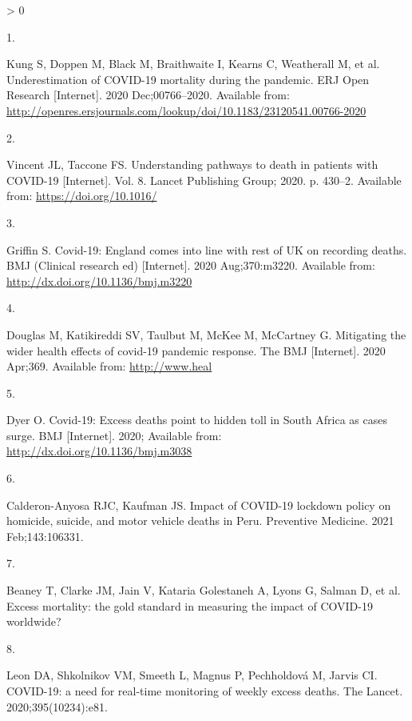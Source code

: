 \documentclass[
]{article}
\newlength{\cslhangindent}
\newlength{\csllabelwidth}
\newenvironment{CSLReferences}[2] %
 {%
  \setlength{\parindent}{0pt}
  \ifodd #1 \everypar{\setlength{\hangindent}{\cslhangindent}}\ignorespaces\fi
  \ifnum #2 > 0
  \setlength{\parskip}{#2\baselineskip}
  \fi
 }%
 {}
\newcommand{\CSLLeftMargin}[1]{\parbox[t]{\csllabelwidth}{#1}}
\newcommand{\CSLRightInline}[1]{\parbox[t]{\linewidth - \csllabelwidth}{#1}\break}
\begin{document}
\hypertarget{refs}{}
\begin{CSLReferences}{0}{0}
\leavevmode\hypertarget{ref-Kung2020}{}%
\CSLLeftMargin{1. }
\CSLRightInline{Kung S, Doppen M, Black M, Braithwaite I, Kearns C, Weatherall M, et al. {Underestimation of COVID-19 mortality during the pandemic}. ERJ Open Research {[}Internet{]}. 2020 Dec;00766--2020. Available from: \url{http://openres.ersjournals.com/lookup/doi/10.1183/23120541.00766-2020}}

\leavevmode\hypertarget{ref-Vincent2020}{}%
\CSLLeftMargin{2. }
\CSLRightInline{Vincent JL, Taccone FS. {Understanding pathways to death in patients with COVID-19} {[}Internet{]}. Vol. 8. Lancet Publishing Group; 2020. p. 430--2. Available from: \url{https://doi.org/10.1016/}}

\leavevmode\hypertarget{ref-Griffin2020}{}%
\CSLLeftMargin{3. }
\CSLRightInline{Griffin S. {Covid-19: England comes into line with rest of UK on recording deaths}. BMJ (Clinical research ed) {[}Internet{]}. 2020 Aug;370:m3220. Available from: \url{http://dx.doi.org/10.1136/bmj.m3220}}

\leavevmode\hypertarget{ref-Douglas2020}{}%
\CSLLeftMargin{4. }
\CSLRightInline{Douglas M, Katikireddi SV, Taulbut M, McKee M, McCartney G. {Mitigating the wider health effects of covid-19 pandemic response}. The BMJ {[}Internet{]}. 2020 Apr;369. Available from: \url{http://www.heal}}

\leavevmode\hypertarget{ref-Dyer2020}{}%
\CSLLeftMargin{5. }
\CSLRightInline{Dyer O. {Covid-19: Excess deaths point to hidden toll in South Africa as cases surge}. BMJ {[}Internet{]}. 2020; Available from: \url{http://dx.doi.org/10.1136/bmj.m3038}}

\leavevmode\hypertarget{ref-Calderon2020}{}%
\CSLLeftMargin{6. }
\CSLRightInline{Calderon-Anyosa RJC, Kaufman JS. {Impact of COVID-19 lockdown policy on homicide, suicide, and motor vehicle deaths in Peru}. Preventive Medicine. 2021 Feb;143:106331. }

\leavevmode\hypertarget{ref-Beaney2020}{}%
\CSLLeftMargin{7. }
\CSLRightInline{Beaney T, Clarke JM, Jain V, Kataria Golestaneh A, Lyons G, Salman D, et al. {Excess mortality: the gold standard in measuring the impact of COVID-19 worldwide?} }

\leavevmode\hypertarget{ref-Leon2020}{}%
\CSLLeftMargin{8. }
\CSLRightInline{Leon DA, Shkolnikov VM, Smeeth L, Magnus P, Pechholdová M, Jarvis CI. {COVID-19: a need for real-time monitoring of weekly excess deaths}. The Lancet. 2020;395(10234):e81. }


\end{CSLReferences}
\end{document}
